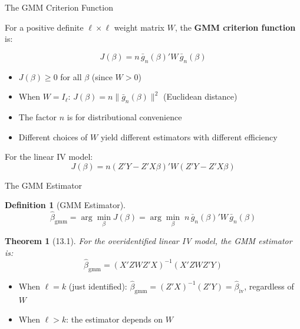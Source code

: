 \documentclass[aspectratio=169, handout, t]{beamer}
\newtheorem{thm}{Theorem}
\newtheorem{defn}{Definition}
\numberwithin{equation}{section}
\begin{document}
\begin{frame}{The GMM Criterion Function}

For a positive definite $\ell \times \ell$ weight matrix $W$, the \textbf{GMM criterion function} is:

$$\boxed{J(\beta) = n\,\bar{g}_n(\beta)' W\, \bar{g}_n(\beta)}$$

\medskip
\begin{itemize}
\item $J(\beta) \geq 0$ for all $\beta$ (since $W > 0$)
\item When $W = I_\ell$: $J(\beta) = n\|\bar{g}_n(\beta)\|^2$ (Euclidean distance)
\item The factor $n$ is for distributional convenience
\item \alert{Different choices of $W$ yield different estimators} with different efficiency
\end{itemize}

\smallskip
For the linear IV model:
$$J(\beta) = n(Z'Y - Z'X\beta)' W (Z'Y - Z'X\beta)$$

\end{frame}

\begin{frame}{The GMM Estimator}

\begin{defn}[GMM Estimator]
$$\hat\beta_{\text{gmm}} = \arg\min_\beta J(\beta) = \arg\min_\beta\; n\,\bar{g}_n(\beta)' W\, \bar{g}_n(\beta)$$
\end{defn}

\bigskip
\begin{thm}[13.1]
For the overidentified linear IV model, the GMM estimator is:
$$\hat\beta_{\text{gmm}} = (X'ZWZ'X)^{-1}(X'ZWZ'Y)$$
\end{thm}

\bigskip
\begin{itemize}
\item When $\ell = k$ (just identified): $\hat\beta_{\text{gmm}} = (Z'X)^{-1}(Z'Y) = \hat\beta_{\text{iv}}$, regardless of $W$
\item When $\ell > k$: the estimator \alert{depends on $W$}
\end{itemize}

\end{frame}
\end{document}

